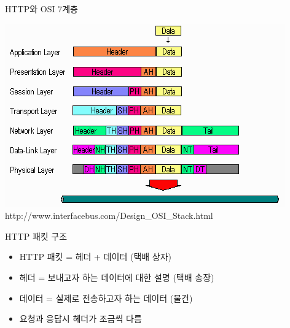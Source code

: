 \documentclass{beamer}
\begin{document}
    \begin{frame}{HTTP와 OSI 7계층}
        \begin{center}
            \includegraphics[width=\textheight]{Images/osidata_encap.png}
            \tiny{http://www.interfacebus.com/Design\_OSI\_Stack.html}
        \end{center}
    \end{frame}

    \begin{frame}{HTTP 패킷 구조}
        \begin{itemize}
            \item HTTP 패킷 = 헤더 + 데이터 (택배 상자)
            \item 헤더 = 보내고자 하는 데이터에 대한 설명 (택배 송장)
            \item 데이터 = 실제로 전송하고자 하는 데이터 (물건)
            \item 요청과 응답시 헤더가 조금씩 다름
        \end{itemize}
    \end{frame}
\end{document}
